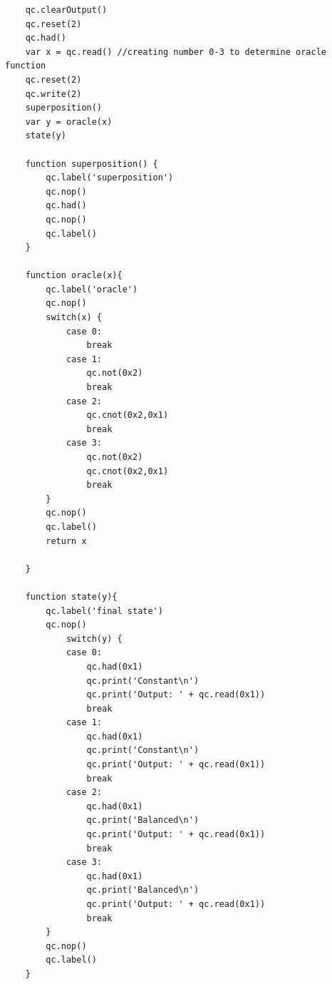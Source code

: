 \documentclass[12pt]{article}
\theoremstyle{definition}
\begin{document}
\begin{lstlisting}
    qc.clearOutput()
    qc.reset(2)
    qc.had()
    var x = qc.read() //creating number 0-3 to determine oracle function
    qc.reset(2)
    qc.write(2)
    superposition()
    var y = oracle(x) 
    state(y)
    
    function superposition() {
        qc.label('superposition')
        qc.nop()
        qc.had()
        qc.nop()
        qc.label()
    }
    
    function oracle(x){
        qc.label('oracle')
        qc.nop()
        switch(x) {
            case 0:
                break
            case 1:
                qc.not(0x2)
                break
            case 2:
                qc.cnot(0x2,0x1)
                break
            case 3:
                qc.not(0x2)
                qc.cnot(0x2,0x1)
                break
        }
        qc.nop()
        qc.label()
        return x
        
    }
    
    function state(y){
        qc.label('final state')
        qc.nop()
            switch(y) {
            case 0:
                qc.had(0x1)
                qc.print('Constant\n')
                qc.print('Output: ' + qc.read(0x1))
                break
            case 1:
                qc.had(0x1)
                qc.print('Constant\n')
                qc.print('Output: ' + qc.read(0x1))
                break
            case 2:
                qc.had(0x1)
                qc.print('Balanced\n')
                qc.print('Output: ' + qc.read(0x1))
                break
            case 3:
                qc.had(0x1)
                qc.print('Balanced\n')
                qc.print('Output: ' + qc.read(0x1))
                break
        }
        qc.nop()
        qc.label()
    }
\end{lstlisting}

\clearpage
\end{document}
